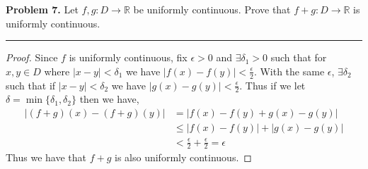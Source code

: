 \documentclass[leqno]{article}
\theoremstyle{nonumberplain}
\newtheorem{proof}{Proof}
\begin{document}


\noindent\textbf{Problem 7.} Let $f,g \colon D \to \mathbb{R}$ be uniformly continuous. Prove that $f+g \colon D \to \mathbb{R}$ is uniformly continuous.

\noindent\rule[0.5ex]{\linewidth}{1pt}

\begin{proof}
	Since $f$ is uniformly continuous, fix $\epsilon >0$ and $\exists \delta_1 >0$ such that for $x,y \in D$ where $|x-y|<\delta_1$ we have $|f(x)-f(y)|<\frac{\epsilon}{2}$.  With the same $\epsilon$, $\exists \delta_2$ such that if $|x-y|<\delta_2$ we have $|g(x)-g(y)|<\frac{\epsilon}{2}$.  Thus if we let $\delta = \min \{\delta_1,\delta_2\}$ then we have,
	\begin{align*}
		|(f+g)(x)-(f+g)(y)|&=|f(x)-f(y)+g(x)-g(y)|\\
		&\leq |f(x)-f(y)|+|g(x)-g(y)|\\
		&<\frac{\epsilon}{2}+\frac{\epsilon}{2}=\epsilon
	\end{align*}
	Thus we have that $f+g$ is also uniformly continuous.
\end{proof}
\end{document}
